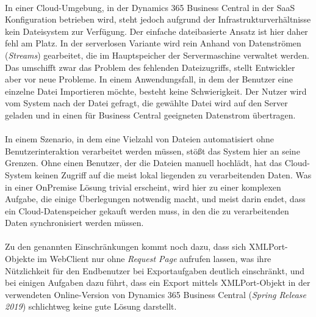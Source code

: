 \paragraph{}
In einer Cloud-Umgebung, in der Dynamics 365 Business Central in der SaaS Konfiguration betrieben wird, steht jedoch aufgrund der Infrastrukturverhältnisse kein Dateisystem zur Verfügung. Der einfache dateibasierte Ansatz ist hier daher fehl am Platz. In der serverlosen Variante wird rein Anhand von Datenströmen (\textit{Streams}) gearbeitet, die im Hauptspeicher der Servermaschine verwaltet werden. 
Das umschifft zwar das Problem des fehlenden Dateizugriffs, stellt Entwickler aber vor neue Probleme. In einem Anwendungsfall, in dem der Benutzer eine einzelne Datei Importieren möchte, besteht keine Schwierigkeit. Der Nutzer wird vom System nach der Datei gefragt, die gewählte Datei wird auf den Server geladen und in einen für Business Central geeigneten Datenstrom übertragen. 

\paragraph{}
In einem Szenario, in dem eine Vielzahl von Dateien automatisiert ohne Benutzerinteraktion verarbeitet werden müssen, stößt das System hier an seine Grenzen. Ohne einen Benutzer, der die Dateien manuell hochlädt, hat das Cloud-System keinen Zugriff auf die meist lokal liegenden zu verarbeitenden Daten. Was in einer OnPremise Lösung trivial erscheint, wird hier zu einer komplexen Aufgabe, die einige Überlegungen notwendig macht, und meist darin endet, dass ein Cloud-Datenspeicher gekauft werden muss, in den die zu verarbeitenden Daten synchronisiert werden müssen. 

\paragraph{}
Zu den genannten Einschränkungen kommt noch dazu, dass sich XMLPort-Objekte im WebClient nur ohne \textit{Request Page} aufrufen lassen, was ihre Nützlichkeit für den Endbenutzer bei Exportaufgaben deutlich einschränkt, und bei einigen Aufgaben dazu führt, dass ein Export mittels XMLPort-Objekt in der verwendeten Online-Version von Dynamics 365 Business Central (\textit{Spring Release 2019}) schlichtweg keine gute Lösung darstellt.
\pagebreak

